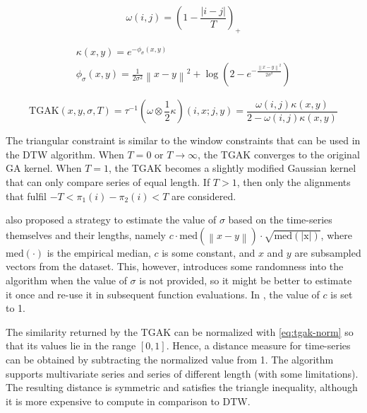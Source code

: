 \begin{equation}
\label{eq:int-kernel}
\omega(i,j) = \left( 1 - \frac{|i - j|}{T} \right)_{+}
\end{equation}

\begin{subequations}
\label{eq:phi-kernel}
\begin{gather}
\kappa (x,y) = e ^ {-\phi_\sigma(x,y)} \\
\phi_\sigma(x,y) = \frac{1}{2 \sigma ^ 2} \left\lVert x - y \right\rVert ^ 2 + \log \left( 2 - e ^ {-\frac{\left\lVert x - y \right\rVert ^ 2}{2 \sigma ^ 2}} \right)
\end{gather}
\end{subequations}

\begin{equation}
\label{eq:tga-kernel}
\text{TGAK}(x,y,\sigma,T) = \tau ^ {-1} \left( \omega \otimes \frac{1}{2} \kappa \right) (i,x;j,y) = \frac{\omega(i,j) \kappa (x,y)}{2 - \omega(i,j) \kappa (x,y)}
\end{equation}

The triangular constraint is similar to the window constraints that can be used in the DTW algorithm.
When $T = 0$ or $T \rightarrow \infty$,
the TGAK converges to the original GA kernel.
When $T = 1$, the TGAK becomes a slightly modified Gaussian kernel that can only compare series of equal length.
If $T > 1$, then only the alignments that fulfil $-T < \pi_1(i) - \pi_2(i) < T$ are considered.

\citet{cuturi2011} also proposed a strategy to estimate the value of $\sigma$ based on the time-series themselves and their lengths,
namely $c \cdot \text{med}(\left\lVert x - y \right\rVert) \cdot \sqrt{\text{med}(|\text{x}|)}$,
where $\text{med}(\cdot)$ is the empirical median,
$c$ is some constant,
and $x$ and $y$ are subsampled vectors from the dataset.
This, however, introduces some randomness into the algorithm when the value of $\sigma$ is not provided,
so it might be better to estimate it once and re-use it in subsequent function evaluations.
In \dtwclust{}, the value of $c$ is set to 1.

The similarity returned by the TGAK can be normalized with \cref{eq:tgak-norm} so that its values lie in the range $[0,1]$.
Hence, a distance measure for time-series can be obtained by subtracting the normalized value from 1.
The algorithm supports multivariate series and series of different length (with some limitations).
The resulting distance is symmetric and satisfies the triangle inequality,
although it is more expensive to compute in comparison to DTW.

